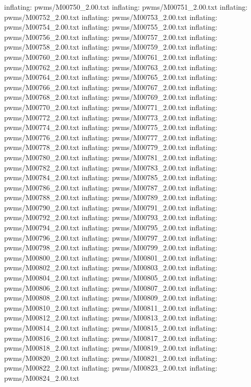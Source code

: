 \documentclass[letterpaper,10pt,english]{sphinxmanual}
\begin{document}
{\begin{sphinxVerbatim}[commandchars=\\\{\}]
  inflating: pwms/M00750\_2.00.txt
  inflating: pwms/M00751\_2.00.txt
  inflating: pwms/M00752\_2.00.txt
  inflating: pwms/M00753\_2.00.txt
  inflating: pwms/M00754\_2.00.txt
  inflating: pwms/M00755\_2.00.txt
  inflating: pwms/M00756\_2.00.txt
  inflating: pwms/M00757\_2.00.txt
  inflating: pwms/M00758\_2.00.txt
  inflating: pwms/M00759\_2.00.txt
  inflating: pwms/M00760\_2.00.txt
  inflating: pwms/M00761\_2.00.txt
  inflating: pwms/M00762\_2.00.txt
  inflating: pwms/M00763\_2.00.txt
  inflating: pwms/M00764\_2.00.txt
  inflating: pwms/M00765\_2.00.txt
  inflating: pwms/M00766\_2.00.txt
  inflating: pwms/M00767\_2.00.txt
  inflating: pwms/M00768\_2.00.txt
  inflating: pwms/M00769\_2.00.txt
  inflating: pwms/M00770\_2.00.txt
  inflating: pwms/M00771\_2.00.txt
  inflating: pwms/M00772\_2.00.txt
  inflating: pwms/M00773\_2.00.txt
  inflating: pwms/M00774\_2.00.txt
  inflating: pwms/M00775\_2.00.txt
  inflating: pwms/M00776\_2.00.txt
  inflating: pwms/M00777\_2.00.txt
  inflating: pwms/M00778\_2.00.txt
  inflating: pwms/M00779\_2.00.txt
  inflating: pwms/M00780\_2.00.txt
  inflating: pwms/M00781\_2.00.txt
  inflating: pwms/M00782\_2.00.txt
  inflating: pwms/M00783\_2.00.txt
  inflating: pwms/M00784\_2.00.txt
  inflating: pwms/M00785\_2.00.txt
  inflating: pwms/M00786\_2.00.txt
  inflating: pwms/M00787\_2.00.txt
  inflating: pwms/M00788\_2.00.txt
  inflating: pwms/M00789\_2.00.txt
  inflating: pwms/M00790\_2.00.txt
  inflating: pwms/M00791\_2.00.txt
  inflating: pwms/M00792\_2.00.txt
  inflating: pwms/M00793\_2.00.txt
  inflating: pwms/M00794\_2.00.txt
  inflating: pwms/M00795\_2.00.txt
  inflating: pwms/M00796\_2.00.txt
  inflating: pwms/M00797\_2.00.txt
  inflating: pwms/M00798\_2.00.txt
  inflating: pwms/M00799\_2.00.txt
  inflating: pwms/M00800\_2.00.txt
  inflating: pwms/M00801\_2.00.txt
  inflating: pwms/M00802\_2.00.txt
  inflating: pwms/M00803\_2.00.txt
  inflating: pwms/M00804\_2.00.txt
  inflating: pwms/M00805\_2.00.txt
  inflating: pwms/M00806\_2.00.txt
  inflating: pwms/M00807\_2.00.txt
  inflating: pwms/M00808\_2.00.txt
  inflating: pwms/M00809\_2.00.txt
  inflating: pwms/M00810\_2.00.txt
  inflating: pwms/M00811\_2.00.txt
  inflating: pwms/M00812\_2.00.txt
  inflating: pwms/M00813\_2.00.txt
  inflating: pwms/M00814\_2.00.txt
  inflating: pwms/M00815\_2.00.txt
  inflating: pwms/M00816\_2.00.txt
  inflating: pwms/M00817\_2.00.txt
  inflating: pwms/M00818\_2.00.txt
  inflating: pwms/M00819\_2.00.txt
  inflating: pwms/M00820\_2.00.txt
  inflating: pwms/M00821\_2.00.txt
  inflating: pwms/M00822\_2.00.txt
  inflating: pwms/M00823\_2.00.txt
  inflating: pwms/M00824\_2.00.txt

\end{sphinxVerbatim}}
\end{document}
